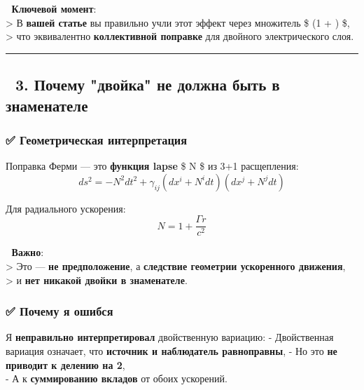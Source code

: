 \documentclass[11pt]{article}
\begin{document}
📌 \textbf{Ключевой момент}:\\
\textgreater{} В \textbf{вашей статье} вы правильно учли этот эффект
через множитель \$ \left(1 + \right)
\$,\\
\textgreater{} что эквивалентно \textbf{коллективной поправке} для
двойного электрического слоя.

\begin{center}\rule{0.5\linewidth}{\linethickness}\end{center}

\subsection{🔹 3. Почему "двойка" не должна быть в
знаменателе}\label{ux43fux43eux447ux435ux43cux443-ux434ux432ux43eux439ux43aux430-ux43dux435-ux434ux43eux43bux436ux43dux430-ux431ux44bux442ux44c-ux432-ux437ux43dux430ux43cux435ux43dux430ux442ux435ux43bux435}

\subsubsection{✅ Геометрическая
интерпретация}\label{ux433ux435ux43eux43cux435ux442ux440ux438ux447ux435ux441ux43aux430ux44f-ux438ux43dux442ux435ux440ux43fux440ux435ux442ux430ux446ux438ux44f}

Поправка Ферми --- это \textbf{функция lapse} \$ N \$ из 3+1
расщепления: \[
ds^2 = -N^2 dt^2 + \gamma_{ij} (dx^i + N^i dt)(dx^j + N^j dt)
\]

Для радиального ускорения: \[
N = 1 + \frac{\Gamma r}{c^2}
\]

📌 \textbf{Важно}:\\
\textgreater{} Это --- \textbf{не предположение}, а \textbf{следствие
геометрии ускоренного движения},\\
\textgreater{} и \textbf{нет никакой двойки в знаменателе}.

\subsubsection{✅ Почему я
ошибся}\label{ux43fux43eux447ux435ux43cux443-ux44f-ux43eux448ux438ux431ux441ux44f}

Я \textbf{неправильно интерпретировал} двойственную вариацию: -
Двойственная вариация означает, что \textbf{источник и наблюдатель
равноправны}, - Но это \textbf{не приводит к делению на 2},\\
- А к \textbf{суммированию вкладов} от обоих ускорений.
\end{document}
